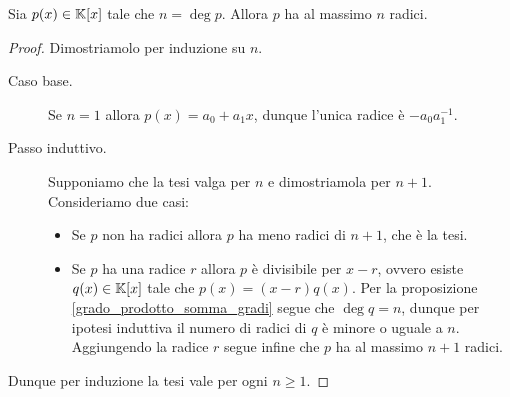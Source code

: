 \begin{proposition}
    Sia $p(x) \in \mathbb{K}[x]$ tale che $n = \deg p$. Allora $p$ ha al massimo $n$ radici.
\end{proposition}
\begin{proof}
    Dimostriamolo per induzione su $n$.
    \begin{description}
        \item[Caso base.] Se $n = 1$ allora $p(x) = a_0 + a_1x$, dunque l'unica radice è $-a_0a_1^{-1}$.
        \item[Passo induttivo.] Supponiamo che la tesi valga per $n$ e dimostriamola per $n+1$. Consideriamo due casi: \begin{itemize}
            \item Se $p$ non ha radici allora $p$ ha meno radici di $n+1$, che è la tesi.
            \item Se $p$ ha una radice $r$ allora $p$ è divisibile per $x-r$, ovvero esiste $q(x) \in \mathbb{K}[x]$ tale che $p(x) = (x-r)q(x)$. Per la proposizione \ref{grado_prodotto_somma_gradi} segue che $\deg q = n$, dunque per ipotesi induttiva il numero di radici di $q$ è minore o uguale a $n$. Aggiungendo la radice $r$ segue infine che $p$ ha al massimo $n + 1$ radici.
        \end{itemize}  
    \end{description}
    Dunque per induzione la tesi vale per ogni $n \geq 1$.
\end{proof}